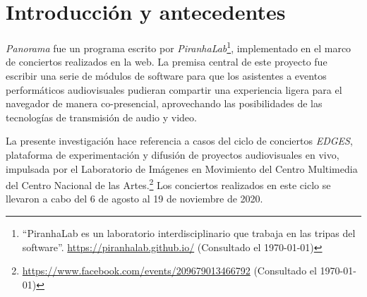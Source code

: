 
\section*{Introducción y antecedentes} %

\textit{Panorama} \citep{panorama} fue un programa escrito por \textit{PiranhaLab}\footnote{``PiranhaLab es un laboratorio interdisciplinario que trabaja en las tripas del software''. \url{https://piranhalab.github.io/} (Consultado el \today)}, implementado en el marco de conciertos realizados en la web. La premisa central de este proyecto fue escribir una serie de módulos de software para que los asistentes a eventos performáticos audiovisuales pudieran compartir una experiencia ligera para el navegador de manera co-presencial, aprovechando las posibilidades de las tecnologías de transmisión de audio y video. %

La presente investigación hace referencia a casos del ciclo de conciertos \textit{EDGES}, plataforma de experimentación y difusión de proyectos audiovisuales en vivo, impulsada por el Laboratorio de Imágenes en Movimiento del Centro Multimedia del Centro Nacional de las Artes.\footnote{\url{https://www.facebook.com/events/209679013466792} (Consultado el \today)} Los conciertos realizados en este ciclo se llevaron a cabo del 6 de agosto al 19 de noviembre de 2020.





